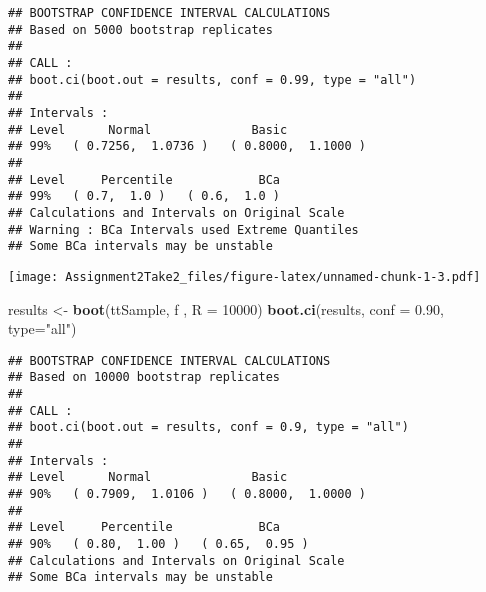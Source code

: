 \documentclass[]{article}
\newenvironment{Shaded}{\begin{snugshade}}{\end{snugshade}}
\newcommand{\KeywordTok}[1]{\textcolor[rgb]{0.13,0.29,0.53}{\textbf{#1}}}
\newcommand{\DataTypeTok}[1]{\textcolor[rgb]{0.13,0.29,0.53}{#1}}
\newcommand{\DecValTok}[1]{\textcolor[rgb]{0.00,0.00,0.81}{#1}}
\newcommand{\FloatTok}[1]{\textcolor[rgb]{0.00,0.00,0.81}{#1}}
\newcommand{\StringTok}[1]{\textcolor[rgb]{0.31,0.60,0.02}{#1}}
\newcommand{\OperatorTok}[1]{\textcolor[rgb]{0.81,0.36,0.00}{\textbf{#1}}}
\newcommand{\NormalTok}[1]{#1}
\begin{document}
\begin{verbatim}
## BOOTSTRAP CONFIDENCE INTERVAL CALCULATIONS
## Based on 5000 bootstrap replicates
## 
## CALL : 
## boot.ci(boot.out = results, conf = 0.99, type = "all")
## 
## Intervals : 
## Level      Normal              Basic         
## 99%   ( 0.7256,  1.0736 )   ( 0.8000,  1.1000 )  
## 
## Level     Percentile            BCa          
## 99%   ( 0.7,  1.0 )   ( 0.6,  1.0 )  
## Calculations and Intervals on Original Scale
## Warning : BCa Intervals used Extreme Quantiles
## Some BCa intervals may be unstable
\end{verbatim}

\begin{Shaded}
\end{Shaded}

\texttt{[image: Assignment2Take2\_files/figure-latex/unnamed-chunk-1-3.pdf]}

\begin{Shaded}
\begin{Highlighting}[]
\NormalTok{results <-}\StringTok{ }\KeywordTok{boot}\NormalTok{(ttSample, f , }\DataTypeTok{R =} \DecValTok{10000}\NormalTok{)}
\KeywordTok{boot.ci}\NormalTok{(results, }\DataTypeTok{conf =} \FloatTok{0.90}\NormalTok{, }\DataTypeTok{type=}\StringTok{"all"}\NormalTok{)}
\end{Highlighting}
\end{Shaded}

\begin{verbatim}
## BOOTSTRAP CONFIDENCE INTERVAL CALCULATIONS
## Based on 10000 bootstrap replicates
## 
## CALL : 
## boot.ci(boot.out = results, conf = 0.9, type = "all")
## 
## Intervals : 
## Level      Normal              Basic         
## 90%   ( 0.7909,  1.0106 )   ( 0.8000,  1.0000 )  
## 
## Level     Percentile            BCa          
## 90%   ( 0.80,  1.00 )   ( 0.65,  0.95 )  
## Calculations and Intervals on Original Scale
## Some BCa intervals may be unstable
\end{verbatim}
\end{document}
